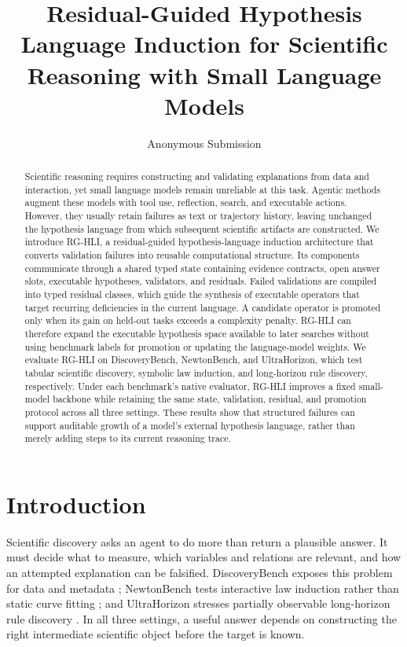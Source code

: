\documentclass[letterpaper]{article}
\title{Residual-Guided Hypothesis Language Induction for Scientific Reasoning with Small Language Models}
\author{Anonymous Submission}
\begin{document}
\maketitle

\begin{abstract}
Scientific reasoning requires constructing and validating explanations from
data and interaction, yet small language models remain unreliable at this
task. Agentic methods augment these models with tool use, reflection, search,
and executable actions. However, they usually retain failures as text or
trajectory history, leaving unchanged the hypothesis language from which
subsequent scientific artifacts are constructed. We introduce RG-HLI, a
residual-guided hypothesis-language induction architecture that converts
validation failures into reusable computational structure. Its components
communicate through a shared typed state containing evidence contracts, open
answer slots, executable hypotheses, validators, and residuals. Failed
validations are compiled into typed residual classes, which guide the synthesis
of executable operators that target recurring deficiencies in the current
language. A candidate operator is promoted only when its gain on held-out tasks
exceeds a complexity penalty. RG-HLI can therefore expand the executable
hypothesis space available to later searches without using benchmark labels
for promotion or updating the language-model weights. We evaluate RG-HLI on
DiscoveryBench, NewtonBench, and UltraHorizon, which test tabular scientific
discovery, symbolic law induction, and long-horizon rule discovery,
respectively. Under each benchmark's native evaluator, RG-HLI improves a fixed
small-model backbone while retaining the same state, validation, residual, and
promotion protocol across all three settings. These results show that
structured failures can support auditable growth of a model's external
hypothesis language, rather than merely adding steps to its current reasoning
trace.
\end{abstract}

\section{Introduction}

Scientific discovery asks an agent to do more than return a plausible answer.
It must decide what to measure, which variables and relations are relevant, and
how an attempted explanation can be falsified. DiscoveryBench exposes this
problem for data and metadata \citep{discoverybench}; NewtonBench tests
interactive law induction rather than static curve fitting \citep{newtonbench};
and UltraHorizon stresses partially observable long-horizon rule discovery
\citep{ultrahorizon}. In all three settings, a useful answer depends on
constructing the right intermediate scientific object before the target is
known.
\end{document}
